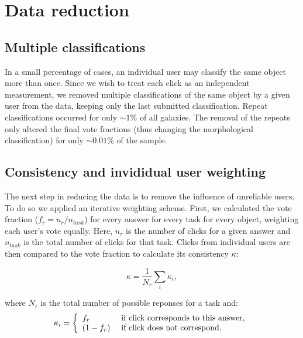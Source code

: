 \documentclass[useAMS,usenatbib]{mn2e}
\begin{document}

\section{Data reduction} \label{sec-datareduction}

\subsection{Multiple classifications}
In a small percentage of cases, an individual user may classify the same object more than once. Since we wish to treat each click as an independent measurement, we removed multiple classifications of the same object by a given user from the data, keeping only the last submitted classification. Repeat classifications occurred for only $\sim1\%$ of all galaxies. The removal of the repeats only altered the final vote fractions (thus changing the morphological classification) for only $\sim0.01\%$ of the sample.  

\subsection{Consistency and invididual user weighting}\label{ssec-consistency}

The next step in reducing the data is to remove the influence of unreliable users. To do so we applied an iterative weighting scheme. First, we calculated the vote fraction ($f_r = n_{r}/n_{task}$) for every answer for every task for every object, weighting each user's vote equally. Here, $n_r$ is the number of clicks for a given answer and $n_{task}$ is the total number of clicks for that task. Clicks from individual users are then compared to the vote fraction to calculate its consistency $\kappa$:

\begin{equation}
\kappa = \frac{1}{N_r}\sum_i{\kappa_i},
\label{eqn-consistency}
\end{equation}

where $N_r$ is the total number of possible reponses for a task and: 
\begin{equation}
    \kappa_i = \left\{
    \begin{array}{l l}
      f_r       & \text{ if click corresponds to this answer,} \\
      (1 - f_r) & \text{ if click does not correspond.}\\
    \end{array} \right.
    \label{eqn-consistency2}
 \end{equation}
\end{document}
